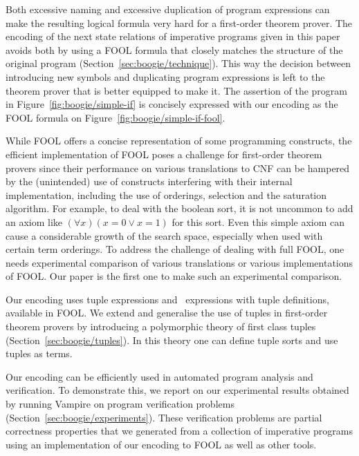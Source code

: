 Both excessive naming and excessive duplication of program expressions can make the resulting logical formula very hard for a first-order theorem prover. The encoding of the next state relations of imperative programs given in this paper avoids both by using a FOOL formula that closely matches the structure of the original program (Section~\ref{sec:boogie/technique}). This way the decision between introducing new symbols and duplicating program expressions is left to the theorem prover that is better equipped to make it. The assertion of the program in Figure~\ref{fig:boogie/simple-if} is concisely expressed with our encoding as the FOOL formula on Figure~\ref{fig:boogie/simple-if-fool}.

While FOOL offers a concise representation of some programming constructs, the efficient implementation of FOOL poses a challenge for first-order theorem provers since their performance on various translations to CNF can be hampered by the (unintended) use of constructs interfering with their internal implementation, including the use of orderings, selection and the saturation algorithm. For example, to deal with the boolean sort, it is not uncommon to add an axiom like $(\forall x)(x = 0 \vee x = 1)$ for this sort. Even this simple axiom can cause a considerable growth of the search space, especially when used with certain term orderings. To address the challenge of dealing with full FOOL, one needs experimental comparison of various translations or various implementations of FOOL. Our paper is the first one to make such an experimental comparison.

Our encoding uses tuple expressions and \LETIN\ expressions with tuple definitions, available in FOOL. We extend and generalise the use of tuples in first-order theorem provers by introducing a polymorphic theory of first class tuples (Section~\ref{sec:boogie/tuples}). In this theory one can define tuple sorts and use tuples as terms.

Our encoding can be efficiently used in automated program analysis and verification. To demonstrate this, we report on our experimental results obtained by running Vampire on program verification problems (Section~\ref{sec:boogie/experiments}). These verification problems are partial correctness properties that we generated from a collection of imperative programs using an implementation of our encoding to FOOL as well as other tools.

